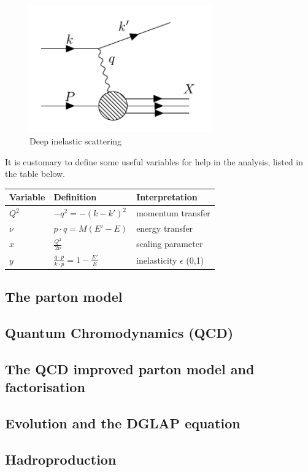\begin{figure}[H]
\label{fig:dis}
\centering
\includegraphics[width=0.7\textwidth]{../diagrams/disdiag.pdf}
\caption{Deep inelastic scattering}
\end{figure}

It is customary to define some useful variables for help in the analysis, listed in the table below.
\begin{table}[H]
\centering
\begin{tabular}{l|l|l}
  Variable & Definition & Interpretation   \\
 \hline
  $Q^2$ & $- q^2 = -(k-k')^2$   & momentum transfer    \\
  $\nu$ & $p \cdot q = M(E'-E)$ & energy transfer  \\
  $x$   & $\frac{Q^2}{2\nu}$    & scaling parameter \\
  $y$   & $\frac{q \cdot p}{k \cdot p} = 1 - \frac{E'}{E}$ & inelasticity $\epsilon$ (0,1)
\end{tabular}
\end{table}
\subsection{The parton model}
\subsection{Quantum Chromodynamics (QCD)}
\subsection{The QCD improved parton model and factorisation}
\subsection{Evolution and the DGLAP equation}
\subsection{Hadroproduction}

